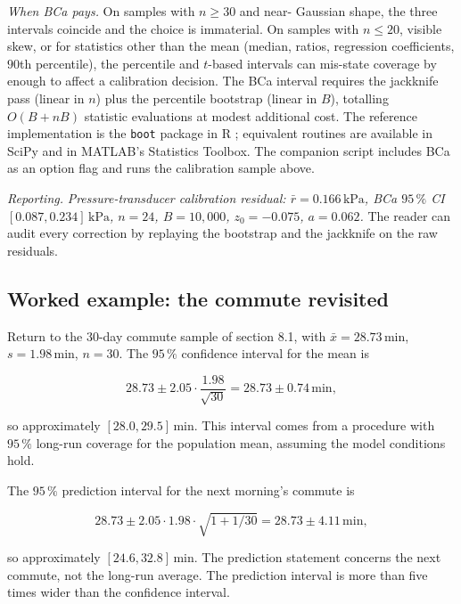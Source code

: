 \textit{When BCa pays.} On samples with $n \geq 30$ and near-
Gaussian shape, the three intervals coincide and the choice is
immaterial. On samples with $n \leq 20$, visible skew, or for
statistics other than the mean (median, ratios, regression
coefficients, $90$th percentile), the percentile and $t$-based
intervals can mis-state coverage by enough to affect a calibration
decision. The BCa interval requires the jackknife pass (linear in
$n$) plus the percentile bootstrap (linear in $B$), totalling
$O(B + n B)$ statistic evaluations at modest additional cost. The
reference implementation is the \texttt{boot} package in R
\cite{text:ch08-davison-hinkley-1997}; equivalent routines are
available in SciPy and in MATLAB's Statistics Toolbox. The
companion script
includes BCa as an option flag and runs the calibration sample
above.

\textit{Reporting.} \emph{Pressure-transducer calibration residual:
$\bar{r} = 0.166 \,\si{\kilo\pascal}$, BCa $95 \,\%$ CI
$[0.087, 0.234] \,\si{\kilo\pascal}$, $n = 24$, $B = 10{,}000$,
$z_{0} = -0.075$, $a = 0.062$.} The reader can audit every
correction by replaying the bootstrap and the jackknife on the raw
residuals.

\subsection{Worked example: the commute revisited}

Return to the $30$-day commute sample of section 8.1, with $\bar{x}
= 28.73 \,\text{min}$, $s = 1.98 \,\text{min}$, $n = 30$. The
$95 \,\%$ confidence interval for the mean is

\[
28.73 \pm 2.05 \cdot \frac{1.98}{\sqrt{30}}
= 28.73 \pm 0.74 \,\text{min},
\]

so approximately $[28.0, 29.5] \,\text{min}$. This interval comes
from a procedure with $95 \,\%$ long-run coverage for the
population mean, assuming the model conditions hold.

The $95 \,\%$ prediction interval for the next morning's commute is

\[
28.73 \pm 2.05 \cdot 1.98 \cdot \sqrt{1 + 1/30}
= 28.73 \pm 4.11 \,\text{min},
\]

so approximately $[24.6, 32.8] \,\text{min}$. The prediction
statement concerns the next commute, not the long-run average. The
prediction interval is more than five times wider than the
confidence interval.

